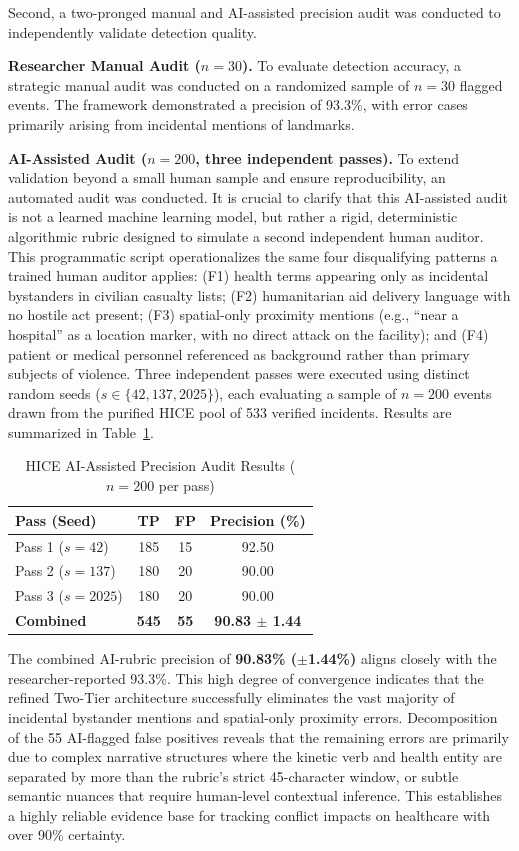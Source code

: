 \documentclass[conference]{IEEEtran}
\begin{document}
Second, a two-pronged manual and AI-assisted precision audit was conducted to independently validate detection quality.

\textbf{Researcher Manual Audit ($n=30$).}
To evaluate detection accuracy, a strategic manual audit was conducted on a randomized sample of $n=30$ flagged events. The framework demonstrated a precision of 93.3\%, with error cases primarily arising from incidental mentions of landmarks.

\textbf{AI-Assisted Audit ($n=200$, three independent passes).}
To extend validation beyond a small human sample and ensure reproducibility, an automated audit was conducted. It is crucial to clarify that this AI-assisted audit is not a learned machine learning model, but rather a rigid, deterministic algorithmic rubric designed to simulate a second independent human auditor. This programmatic script operationalizes the same four disqualifying patterns a trained human auditor applies: (F1) health terms appearing only as incidental bystanders in civilian casualty lists; (F2) humanitarian aid delivery language with no hostile act present; (F3) spatial-only proximity mentions (e.g., ``near a hospital'' as a location marker, with no direct attack on the facility); and (F4) patient or medical personnel referenced as background rather than primary subjects of violence. Three independent passes were executed using distinct random seeds ($s \in \{42, 137, 2025\}$), each evaluating a sample of $n=200$ events drawn from the purified HICE pool of 533 verified incidents. Results are summarized in Table~\ref{tab:hice_audit}.

\begin{table}[h]
\centering
\caption{HICE AI-Assisted Precision Audit Results ($n=200$ per pass)}
\label{tab:hice_audit}
\begin{tabular}{lccc}
\hline
\textbf{Pass (Seed)} & \textbf{TP} & \textbf{FP} & \textbf{Precision (\%)} \\
\hline
Pass 1 ($s=42$)    & 185 & 15 & 92.50 \\
Pass 2 ($s=137$)   & 180 & 20 & 90.00 \\
Pass 3 ($s=2025$)  & 180 & 20 & 90.00 \\
\hline
\textbf{Combined}  & \textbf{545} & \textbf{55} & \textbf{90.83 $\pm$ 1.44} \\
\hline
\end{tabular}
\end{table}

The combined AI-rubric precision of \textbf{90.83\% ($\pm$1.44\%)} aligns closely with the researcher-reported 93.3\%. This high degree of convergence indicates that the refined Two-Tier architecture successfully eliminates the vast majority of incidental bystander mentions and spatial-only proximity errors. Decomposition of the 55 AI-flagged false positives reveals that the remaining errors are primarily due to complex narrative structures where the kinetic verb and health entity are separated by more than the rubric's strict 45-character window, or subtle semantic nuances that require human-level contextual inference. This establishes a highly reliable evidence base for tracking conflict impacts on healthcare with over 90\% certainty.
\end{document}
